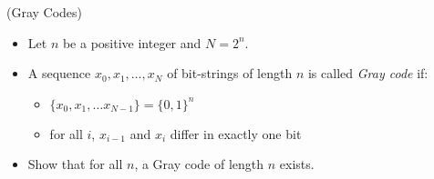 \documentclass[10pt,a4paper,oneside]{article}
\newenvironment{exercice}[1][Exercice]{\begin{trivlist}
\item[\hskip \labelsep {\bfseries #1}]}{\end{trivlist}}
\newenvironment{solution}[1][Solution]{\begin{trivlist}
\item[\hskip \labelsep {\bfseries #1}]}{\end{trivlist}}
\begin{document}
\begin{exercice} (Gray Codes)

\begin{itemize}
\item
Let $n$ be a positive integer and $N = 2^n$.

\item
A sequence $x_0,x_1,\ldots,x_N$ of bit-strings of length $n$ is called \textit{Gray code} if:

\begin{itemize}
\item
$\{ x_0, x_1, \ldots x_{N - 1} \} = \{ 0,1 \}^n$

\item
for all $i$, $x_{i - 1}$ and $x_i$ differ in exactly one bit
\end{itemize}

\item
Show that for all $n$, a Gray code of length $n$ exists.
\end{itemize}

\end{exercice}

\begin{solution}
\end{solution}
\end{document}
